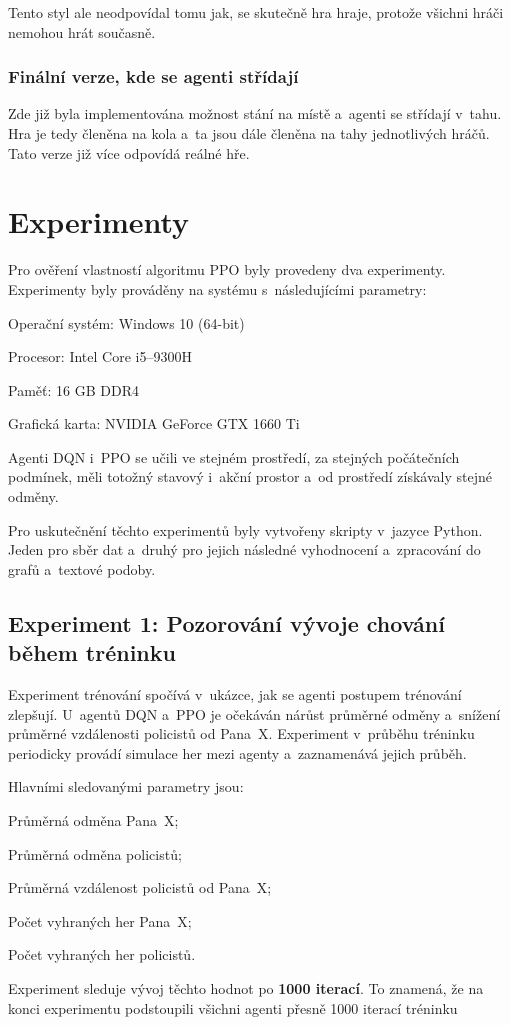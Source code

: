Tento styl ale neodpovídal tomu jak, se skutečně hra hraje, protože všichni hráči nemohou hrát současně.
\subsection{Finální verze, kde se agenti střídají}
Zde již byla implementována možnost stání na místě a~agenti se střídají v~tahu.
Hra je tedy členěna na kola a~ta jsou dále členěna na tahy jednotlivých hráčů.
Tato verze již více odpovídá reálné hře.

\chapter{Experimenty}
\label{ch:experimenty}

Pro ověření vlastností algoritmu PPO byly provedeny dva experimenty.
Experimenty byly prováděny na systému s~následujícími parametry:

\begin{myitemize}
  \item Operační systém: Windows 10 (64-bit)
  \item Procesor: Intel Core i5--9300H
  \item Paměť: 16 GB DDR4
  \item Grafická karta: NVIDIA GeForce GTX 1660 Ti
\end{myitemize}

Agenti DQN i~PPO se učili ve stejném prostředí, za stejných počátečních podmínek, měli totožný stavový i~akční prostor a~od prostředí získávaly stejné odměny.

Pro uskutečnění těchto experimentů byly vytvořeny skripty v~jazyce Python.
Jeden pro sběr dat a~druhý pro jejich následné vyhodnocení a~zpracování do grafů a~textové podoby.

\section{Experiment 1: Pozorování vývoje chování během tréninku}
\label{sec:experiment-1}

Experiment trénování spočívá v~ukázce, jak se agenti postupem trénování zlepšují.
U~agentů DQN a~PPO je očekáván nárůst průměrné odměny a~snížení průměrné vzdálenosti policistů od Pana~X\@.
Experiment v~průběhu tréninku periodicky provádí simulace her mezi agenty a~zaznamenává jejich průběh.

\bigskip
\noindent Hlavními sledovanými parametry jsou:
\begin{myitemize}
  \item Průměrná odměna Pana~X;
  \item Průměrná odměna policistů;
  \item Průměrná vzdálenost policistů od Pana~X;
  \item Počet vyhraných her Pana~X;
  \item Počet vyhraných her policistů.
\end{myitemize}
Experiment sleduje vývoj těchto hodnot po \textbf{1000 iterací}.
To znamená, že na konci experimentu podstoupili všichni agenti přesně 1000 iterací tréninku

